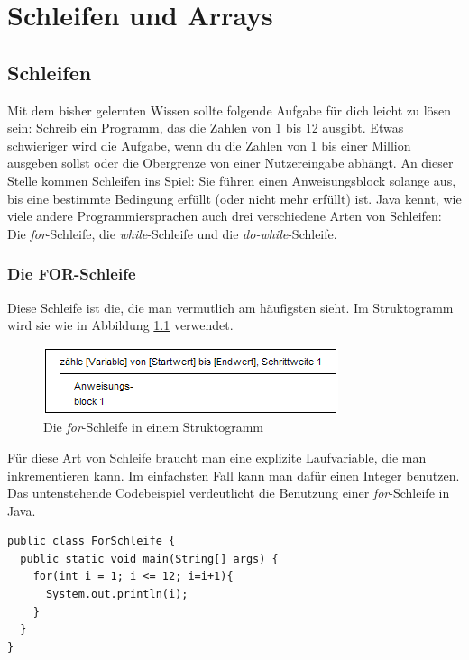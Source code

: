 \chapter{Schleifen und Arrays}

\section{Schleifen}

Mit dem bisher gelernten Wissen sollte folgende Aufgabe für dich leicht zu lösen sein: Schreib ein Programm, das die Zahlen von 1 bis 12 ausgibt. Etwas schwieriger wird die Aufgabe, wenn du die Zahlen von 1 bis einer Million ausgeben sollst oder die Obergrenze von einer Nutzereingabe abhängt. An dieser Stelle kommen Schleifen ins Spiel: Sie führen einen Anweisungsblock solange aus, bis eine bestimmte Bedingung erfüllt (oder nicht mehr erfüllt) ist. Java kennt, wie viele andere Programmiersprachen auch drei verschiedene Arten von Schleifen: Die \textit{for}-Schleife, die \textit{while}-Schleife und die \textit{do-while}-Schleife.

\subsection{Die FOR-Schleife}

Diese Schleife ist die, die man vermutlich am häufigsten sieht. Im Struktogramm wird sie wie in Abbildung \ref{for} verwendet.

\begin{figure}
	\begin{center}\includegraphics[scale=1]{images/for.png}\end{center}
	\caption{Die \textit{for}-Schleife in einem Struktogramm}
	\label{for}
\end{figure}

Für diese Art von Schleife braucht man eine explizite Laufvariable, die man inkrementieren kann. Im einfachsten Fall kann man dafür einen Integer benutzen. Das untenstehende Codebeispiel verdeutlicht die Benutzung einer \textit{for}-Schleife in Java.

\begin{minipage}{\textwidth}
\begin{lstlisting}
public class ForSchleife {
  public static void main(String[] args) {
    for(int i = 1; i <= 12; i=i+1){
      System.out.println(i);
    }
  }
}
\end{lstlisting}
\end{minipage}

